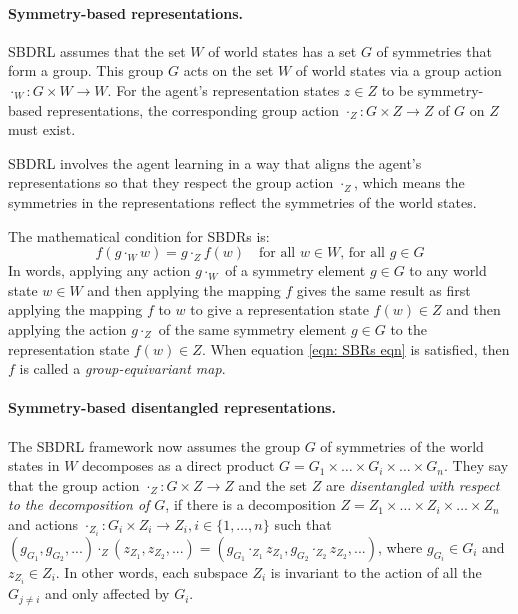 \paragraph{Symmetry-based representations.}
SBDRL assumes that the set $W$ of world states has a set $G$ of symmetries that form a group.
This group $G$ acts on the set $W$ of world states via a group action $\cdot_{W}: G \times W \to W$.
For the agent's representation states $z \in Z$ to be symmetry-based representations, the corresponding group action $\cdot_{Z}: G \times Z \to Z$ of $G$ on $Z$ must exist.

SBDRL involves the agent learning in a way that aligns the agent's representations so that they respect the group action $\cdot_{Z}$, which means the symmetries in the representations reflect the symmetries of the world states.

The mathematical condition for SBDRs is:
\begin{equation}\label{eqn: SBRs eqn}
    f(g \cdot_{W} w) = g \cdot_{Z} f(w) \quad \text{for all $w\in W$, for all $g \in G$}
\end{equation}
In words, applying any action $g \cdot_{W}$ of a symmetry element $g \in G$ to any world state $w \in W$ and then applying the mapping $f$ gives the same result as first applying the mapping $f$ to $w$ to give a representation state $f(w) \in Z$ and then applying the action $g \cdot_Z$ of the same symmetry element $g \in G$ to the representation state $f(w) \in Z$.
When equation \ref{eqn: SBRs eqn} is satisfied, then $f$ is called a \emph{group-equivariant map}.

\paragraph{Symmetry-based disentangled representations.}
The SBDRL framework now assumes the group $G$ of symmetries of the world states in $W$ decomposes as a direct product $G = G_1 \times \hdots \times G_i \times \hdots \times G_n$.
They say that the group action $\cdot_Z : G \times Z \to Z$ and the set $Z$ are \emph{disentangled with respect to the decomposition of $G$}, if there is a decomposition $Z = Z_1 \times \hdots \times Z_i \times \hdots \times Z_n$ and actions $\cdot_{Z_i}: G_i \times Z_i \to Z_i, i \in \{1, \hdots, n\}$ such that $(g_{G_1}, g_{G_2},...) \cdot_Z (z_{Z_1}, z_{Z_2},...) = (g_{G_1} \cdot_{Z_1} z_{Z_1}, g_{G_2} \cdot_{Z_2} z_{Z_2},...)$, where $g_{G_i} \in G_i$ and $z_{Z_i} \in Z_i$.
In other words, each subspace $Z_i$ is invariant to the action of all the $G_{j \neq i}$ and only affected by $G_i$.

